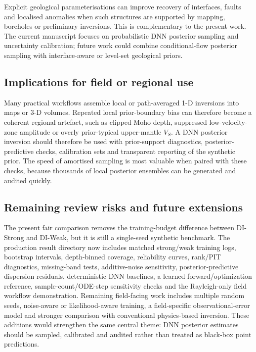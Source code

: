 \documentclass[referee]{gji}
\begin{document}
Explicit geological parameterisations can improve recovery of interfaces, faults and localised anomalies when such structures are supported by mapping, boreholes or preliminary inversions. This is complementary to the present work. The current manuscript focuses on probabilistic DNN posterior sampling and uncertainty calibration; future work could combine conditional-flow posterior sampling with interface-aware or level-set geological priors.

\subsection{Implications for field or regional use}

Many practical workflows assemble local or path-averaged 1-D inversions into maps or 3-D volumes. Repeated local prior-boundary bias can therefore become a coherent regional artefact, such as clipped Moho depth, suppressed low-velocity-zone amplitude or overly prior-typical upper-mantle $V_S$. A DNN posterior inversion should therefore be used with prior-support diagnostics, posterior-predictive checks, calibration sets and transparent reporting of the synthetic prior. The speed of amortised sampling is most valuable when paired with these checks, because thousands of local posterior ensembles can be generated and audited quickly.

\subsection{Remaining review risks and future extensions}

The present fair comparison removes the training-budget difference between DI-Strong and DI-Weak, but it is still a single-seed synthetic benchmark. The production result directory now includes matched strong/weak training logs, bootstrap intervals, depth-binned coverage, reliability curves, rank/PIT diagnostics, missing-band tests, additive-noise sensitivity, posterior-predictive dispersion residuals, deterministic DNN baselines, a learned-forward/optimization reference, sample-count/ODE-step sensitivity checks and the Rayleigh-only field workflow demonstration. Remaining field-facing work includes multiple random seeds, noise-aware or likelihood-aware training, a field-specific observational-error model and stronger comparison with conventional physics-based inversion. These additions would strengthen the same central theme: DNN posterior estimates should be sampled, calibrated and audited rather than treated as black-box point predictions.
\end{document}
